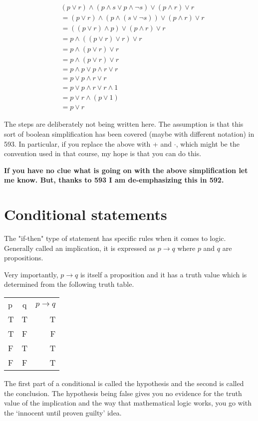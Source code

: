 \documentclass[12pt]{article}
\begin{document}
\begin{align*}
&(p \vee r) \wedge (p \wedge s \vee p \wedge \neg s) \vee (p \wedge r) \vee r \\
&= (p \vee r) \wedge (p \wedge ( s \vee \neg s)) \vee ( p \wedge r) \vee r \\
&= (( p \vee r) \wedge p) \vee ( p \wedge r) \vee r \\
&= p \wedge (( p \vee r)  \vee r) \vee r \\
&= p \wedge (p \vee r) \vee r \\
&= p \wedge (p \vee r) \vee r \\
&= p \wedge p \vee p \wedge r \vee r \\
&= p \vee p \wedge r \vee r \\
&= p \vee p \wedge r \vee r \wedge 1 \\
&= p \vee r \wedge ( p \vee 1) \\
&= p \vee r
\end{align*}

The steps are deliberately not being written here. The assumption is that this sort of boolean simplification has been covered (maybe with different notation) in 593. In particular, if you replace the above with + and $\cdot$, which might be the convention used in that course, my hope is that you can do this.

\textbf{If you have no clue what is going on with the above simplification let me know. But, thanks to 593 I am de-emphasizing this in 592.}

\section*{Conditional statements}

The "if-then" type of statement has specific rules when it comes to logic. Generally called an implication, it is expressed as $p \rightarrow q$ where $p$ and $q$ are propositions.

Very importantly, $p \rightarrow q$ is itself a proposition and it has a truth value which is determined from the following truth table.

\begin{tabular} {l c r}
p & q & $p \rightarrow q$ \\
T & T & T \\
T & F & F \\
F & T & T \\
F & F & T
\end{tabular}

The first part of a conditional is called the hypothesis and the second is called the conclusion. The hypothesis being false gives you no evidence for the truth value of the implication and the way that mathematical logic works, you go with the `innocent until proven guilty' idea. 
\end{document}
